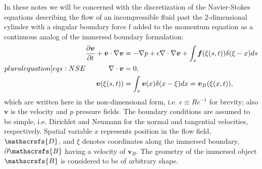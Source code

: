 \documentclass{article}
\numberwithin{equation}{section}
\begin{document}
In these notes we will be concerned with the discretization of the Navier-Stokes equations describing the flow of an incompressible fluid past the 2-dimensional cylinder with a singular boundary force f added to the momentum equation as a continuous analog of the immersed boundary formulation:
\begin{subequations}
\label[pluralequation]{eqs:NSE}
\begin{align}
\label{eqn:momentum-intro}
\frac{\partial \boldsymbol{v}}{\partial t} + \boldsymbol{v} \cdot \nabla \boldsymbol{v} &= -\nabla p + \epsilon \nabla \cdot \nabla \boldsymbol{v} +\int_{s}\boldsymbol{f}(\xi(s,t))\delta(\xi-x)ds\\
\label{eqn:continuity}
\nabla \cdot \boldsymbol{v} &= 0,\\
\boldsymbol{v}(\xi(s,t)) &= \int_x\boldsymbol{v}(x)\delta(x - \xi)dx = \boldsymbol{v}_B(\xi(x,t)),
\end{align}
\end{subequations}
which are written here in the non-dimensional form, i.e. $\epsilon \equiv Re^{-1}$ for brevity; also $\boldsymbol{v}$ is the velocity and $p$ pressure fields. The boundary conditions are assumed to be simple, i.e.  Dirichlet and Neumann for the normal and tangential velocities, respectively. Spatial variable $x$ represents position in the flow field, $\mathscrsfs{D}$, and $\xi$ denotes coordinates along the immersed boundary, $\partial \mathscrsfs{B}$ having a velocity of $\boldsymbol{v}_B$. The geometry of the immersed object $\mathscrsfs{B}$ is considered to be of arbitrary shape. 
\end{document}
